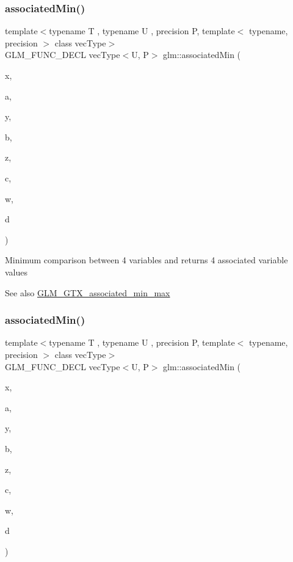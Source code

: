 \subsubsection{\texorpdfstring{associated\+Min()}{associatedMin()}\hspace{0.1cm}{\footnotesize\ttfamily [9/10]}}
{\footnotesize\ttfamily template$<$typename T , typename U , precision P, template$<$ typename, precision $>$ class vec\+Type$>$ \\
G\+L\+M\+\_\+\+F\+U\+N\+C\+\_\+\+D\+E\+CL vec\+Type$<$U, P$>$ glm\+::associated\+Min (\begin{DoxyParamCaption}\item[{T}]{x,  }\item[{vec\+Type$<$ U, P $>$ const \&}]{a,  }\item[{T}]{y,  }\item[{vec\+Type$<$ U, P $>$ const \&}]{b,  }\item[{T}]{z,  }\item[{vec\+Type$<$ U, P $>$ const \&}]{c,  }\item[{T}]{w,  }\item[{vec\+Type$<$ U, P $>$ const \&}]{d }\end{DoxyParamCaption})}

Minimum comparison between 4 variables and returns 4 associated variable values \begin{DoxySeeAlso}{See also}
\hyperlink{group__gtx__associated__min__max}{G\+L\+M\+\_\+\+G\+T\+X\+\_\+associated\+\_\+min\+\_\+max} 
\end{DoxySeeAlso}
\mbox{\label{group__gtx__associated__min__max_ga00a949fd345f4b31b259f033d3ab4a1c}} 
\subsubsection{\texorpdfstring{associated\+Min()}{associatedMin()}\hspace{0.1cm}{\footnotesize\ttfamily [10/10]}}
{\footnotesize\ttfamily template$<$typename T , typename U , precision P, template$<$ typename, precision $>$ class vec\+Type$>$ \\
G\+L\+M\+\_\+\+F\+U\+N\+C\+\_\+\+D\+E\+CL vec\+Type$<$U, P$>$ glm\+::associated\+Min (\begin{DoxyParamCaption}\item[{vec\+Type$<$ T, P $>$ const \&}]{x,  }\item[{U}]{a,  }\item[{vec\+Type$<$ T, P $>$ const \&}]{y,  }\item[{U}]{b,  }\item[{vec\+Type$<$ T, P $>$ const \&}]{z,  }\item[{U}]{c,  }\item[{vec\+Type$<$ T, P $>$ const \&}]{w,  }\item[{U}]{d }\end{DoxyParamCaption})}

